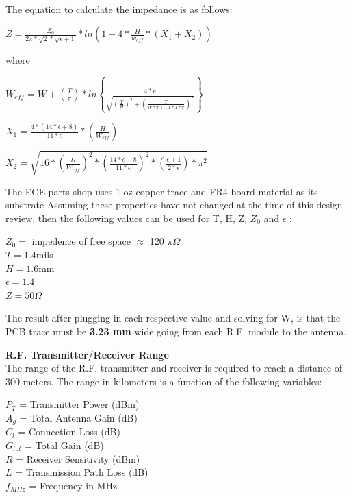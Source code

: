 \documentclass[letterpaper,10pt]{article}
\begin{document}
\begin{spacing}{1.15}
The equation to calculate the impedance is as follows\textsuperscript{\cite{Microstrip}}:
\begin{center}
\large$Z = \frac{Z_0}{2\pi*\sqrt{2}*\sqrt{\epsilon+ 1}} * ln\left(1 + 4*\frac{H}{w_{eff}} * \left(X_1 + X_2 \right )\right )$
\end{center}
where
\begin{center}
	\large $W_{eff} = W + \left(\frac{T}{\pi}\right)*ln\left \{\frac{4*e}{\sqrt{\left(\frac{T}{H}\right)^2 + \left (\frac{T}{W*\pi + 1.1*T*\pi }  \right )^{2}}} \right \}$
	
	\vspace{2.5mm}
	
	$X_1 = \frac{4*\left( 14*\epsilon +8\right)}{11*\epsilon} * \left(\frac{H}{W_{eff}} \right)$
	
	\vspace{2.5mm}
	
	$X_2 = \sqrt{16*\left(\frac{H}{W_{eff}} \right )^2 * \left(\frac{14*\epsilon+8}{11*\epsilon} \right )^2 * \left(\frac{\epsilon + 1}{2*\epsilon} \right ) * \pi^2}$
\end{center}

The ECE parts shop uses 1 oz copper trace and FR4 board material as its substrate \cite{ECE-Electronics-Shop} Assuming these properties have not changed at the time of this design review, then the following values can be used for T, H, Z, $Z_0$ and $\epsilon$ :
\begin{center}
	$Z_0 =$ impedence of free space $\approx$ 120 $\pi \Omega$ \\
	$T = 1.4 $mils\\
	$H =1.6 $mm\\
	$\epsilon = 1.4$ \\
	$Z = 50 \Omega$
\end{center}
The result after plugging in each respective value and solving for W, is that the PCB trace must be \textbf{3.23 mm} wide going from each R.F. module to the antenna.


\normalsize\textbf{R.F. Transmitter/Receiver Range} \\
The range of the R.F. transmitter and receiver is required to reach a distance of 300 meters. The range in kilometers is a function of the following variables:
\begin{center}
$P_T$ = Transmitter Power (dBm) \\
$A_g$ = Total Antenna Gain (dB) \\
$C_l$ = Connection Loss (dB) \\ 
$G_{tot}$ = Total Gain (dB) \\
$R$ = Receiver Sensitivity (dBm) \\
$L$ = Transmission Path Loss (dB) \\
$f_{MHz}$ = Frequency in MHz \\
\end{center}


\end{spacing}
\end{document}

